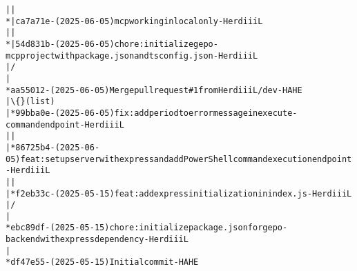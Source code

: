 \begin{alltt}
| | 
* | ca7a71e - (2025-06-05) mcp working in local only - HerdiiiL
| | 
* | 54d831b - (2025-06-05) chore: initialize gepo-mcp project with package.json and tsconfig.json - HerdiiiL
|/  
|   
*   aa55012 - (2025-06-05) Merge pull request \#1 from HerdiiiL/dev - HAHE
|\textbackslash\{\}   (list)
| * 99bba0e - (2025-06-05) fix: add period to error message in execute-command endpoint - HerdiiiL
| | 
| * 86725b4 - (2025-06-05) feat: set up server with express and add PowerShell command execution endpoint - HerdiiiL
| | 
| * f2eb33c - (2025-05-15) feat: add express initialization in index.js - HerdiiiL
|/  
| 
* ebc89df - (2025-05-15) chore: initialize package.json for gepo-backend with express dependency - HerdiiiL
| 
* df47e55 - (2025-05-15) Initial commit - HAHE
\end{alltt}

\pagebreak

